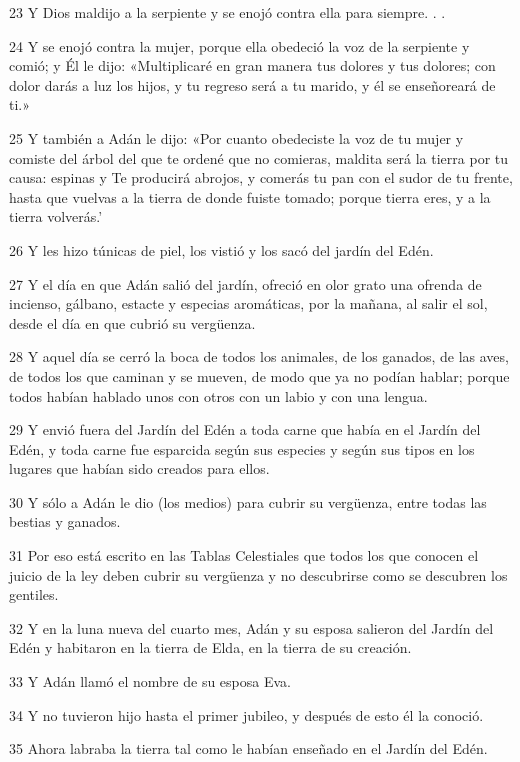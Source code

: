 \par 23 Y Dios maldijo a la serpiente y se enojó contra ella para siempre. . .
\par 24 Y se enojó contra la mujer, porque ella obedeció la voz de la serpiente y comió; y Él le dijo: «Multiplicaré en gran manera tus dolores y tus dolores; con dolor darás a luz los hijos, y tu regreso será a tu marido, y él se enseñoreará de ti.»
\par 25 Y también a Adán le dijo: «Por cuanto obedeciste la voz de tu mujer y comiste del árbol del que te ordené que no comieras, maldita será la tierra por tu causa: espinas y Te producirá abrojos, y comerás tu pan con el sudor de tu frente, hasta que vuelvas a la tierra de donde fuiste tomado; porque tierra eres, y a la tierra volverás.'
\par 26 Y les hizo túnicas de piel, los vistió y los sacó del jardín del Edén.
\par 27 Y el día en que Adán salió del jardín, ofreció en olor grato una ofrenda de incienso, gálbano, estacte y especias aromáticas, por la mañana, al salir el sol, desde el día en que cubrió su vergüenza.
\par 28 Y aquel día se cerró la boca de todos los animales, de los ganados, de las aves, de todos los que caminan y se mueven, de modo que ya no podían hablar; porque todos habían hablado unos con otros con un labio y con una lengua.
\par 29 Y envió fuera del Jardín del Edén a toda carne que había en el Jardín del Edén, y toda carne fue esparcida según sus especies y según sus tipos en los lugares que habían sido creados para ellos.
\par 30 Y sólo a Adán le dio (los medios) para cubrir su vergüenza, entre todas las bestias y ganados.
\par 31 Por eso está escrito en las Tablas Celestiales que todos los que conocen el juicio de la ley deben cubrir su vergüenza y no descubrirse como se descubren los gentiles.
\par 32 Y en la luna nueva del cuarto mes, Adán y su esposa salieron del Jardín del Edén y habitaron en la tierra de Elda, en la tierra de su creación.
\par 33 Y Adán llamó el nombre de su esposa Eva.
\par 34 Y no tuvieron hijo hasta el primer jubileo, y después de esto él la conoció.
\par 35 Ahora labraba la tierra tal como le habían enseñado en el Jardín del Edén.


